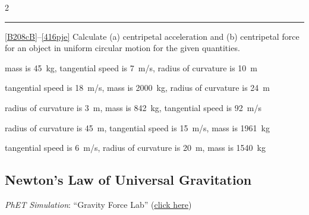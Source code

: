 \documentclass[dvipsnames]{article}
\numberwithin{equation}{section}
\numberwithin{figure}{section}
\begin{document}
\begin{multicols}{2}
{\color{cyan} \hrule}
\vspace{2ex}

\ref{B208cB}--\ref{416pje} Calculate (a) centripetal acceleration and (b) centripetal force for an object in uniform circular motion for the given quantities.

\begin{exercise} \label{B208cB}
mass is \SI{45}{kg}, tangential speed is \SI{7}{m/s}, radius of curvature is \SI{10}{m}
\end{exercise}

\begin{exercise}
tangential speed is \SI{18}{m/s}, mass is \SI{2000}{kg}, radius of curvature is \SI{24}{m}
\end{exercise}

\begin{exercise}
radius of curvature is \SI{3}{m}, mass is \SI{842}{kg}, tangential speed is \SI{92}{m/s}
\end{exercise}

\begin{exercise}
radius of curvature is \SI{45}{m}, tangential speed is \SI{15}{m/s}, mass is \SI{1961}{kg}
\end{exercise}

\begin{exercise}\label{416pje}
tangential speed is \SI{6}{m/s}, radius of curvature is \SI{20}{m}, mass is \SI{1540}{kg}
\end{exercise}


\end{multicols}



\clearpage

\subsection{Newton's Law of Universal Gravitation}

 \textit{PhET Simulation}: ``Gravity Force Lab'' (\href{https://phet.colorado.edu/sims/html/gravity-force-lab/latest/gravity-force-lab_en.html}{click here})
\end{document}
